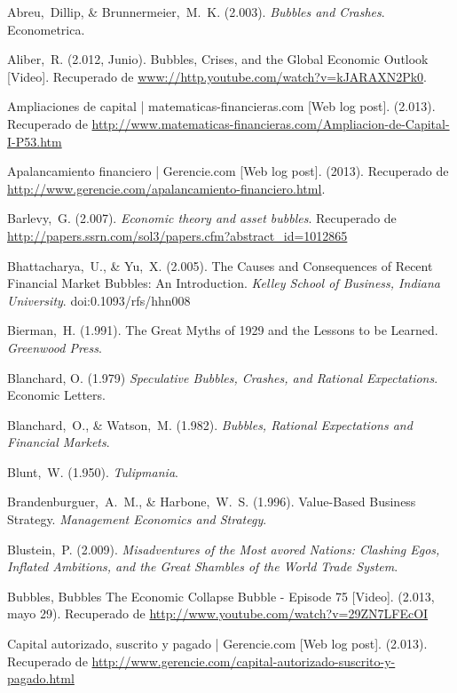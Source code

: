 


\begin{thebibliography}{11}
	
	\bibitem{}
		Abreu, Dillip, \& Brunnermeier, M. K. (2.003). \emph{Bubbles and Crashes}. Econometrica. 

	\bibitem{}
		Aliber, R. (2.012, Junio). Bubbles, Crises, and the Global Economic Outlook [Video]. Recuperado de \url{www://http.youtube.com/watch?v=kJARAXN2Pk0}.

	\bibitem{}
		Ampliaciones de capital | matematicas-financieras.com [Web log post]. (2.013). Recuperado de \url{http://www.matematicas-financieras.com/Ampliacion-de-Capital-I-P53.htm} 	

	\bibitem{}
		Apalancamiento financiero | Gerencie.com [Web log post]. (2013). Recuperado de \url{http://www.gerencie.com/apalancamiento-financiero.html}.

	\bibitem{}
		Barlevy, G. (2.007). \emph{Economic theory and asset bubbles}. Recuperado de \url{http://papers.ssrn.com/sol3/papers.cfm?abstract\_id=1012865}
		
	\bibitem{}
		Bhattacharya, U., \& Yu, X. (2.005). The Causes and Consequences of Recent Financial Market Bubbles: An Introduction. \emph{Kelley School of Business, Indiana University}. doi:0.1093/rfs/hhn008

	\bibitem{}
		Bierman, H. (1.991). The Great Myths of 1929 and the Lessons to be Learned. \emph{Greenwood Press}. 

	\bibitem{}
		Blanchard, O. (1.979) \emph{Speculative Bubbles, Crashes, and Rational Expectations}. Economic Letters.

	\bibitem{}
		Blanchard, O., \& Watson, M. (1.982). \emph{Bubbles, Rational Expectations and Financial Markets}. 
	
	\bibitem{}
		Blunt, W. (1.950). \emph{Tulipmania}. 	 

	\bibitem{}
		Brandenburguer, A. M., \& Harbone, W. S. (1.996). Value-Based Business Strategy. \emph{Management Economics and Strategy}.

	\bibitem{}
		Blustein, P. (2.009). \emph{Misadventures of the Most avored Nations: Clashing Egos, Inflated Ambitions, and the Great Shambles of the World Trade System}. 

	\bibitem{}
		Bubbles, Bubbles The Economic Collapse Bubble - Episode 75 [Video]. (2.013, mayo 29). Recuperado de \url{http://www.youtube.com/watch?v=29ZN7LFEcOI}

	\bibitem{}
		Capital autorizado, suscrito y pagado | Gerencie.com [Web log post]. (2.013). Recuperado de \url{http://www.gerencie.com/capital-autorizado-suscrito-y-pagado.html}


\end{thebibliography}
